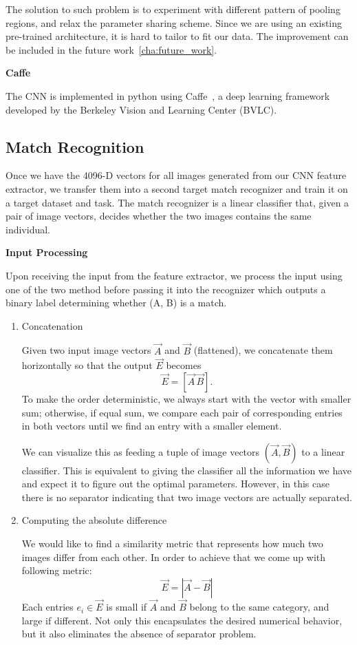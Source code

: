 The solution to such problem is to experiment with different pattern of pooling
regions, and relax the parameter sharing scheme. Since we are using an existing
pre-trained architecture, it is hard to tailor to fit our data. The improvement
can be included in the future work~\ref{cha:future_work}.

\textbf{Caffe}

The CNN is implemented in python using Caffe~\cite{caffe}, a deep learning
framework developed by the Berkeley Vision and Learning Center (BVLC).

\subsection{Match Recognition}

Once we have the 4096-D vectors for all images generated from our CNN feature
extractor, we transfer them into a second target match recognizer and train it
on a target dataset and task. The match recognizer is a linear classifier that,
given a pair of image vectors, decides whether the two images contains the same
individual.

\textbf{Input Processing}

Upon receiving the input from the feature extractor, we process the input using
one of the two method before passing it into the recognizer which outputs a
binary label determining whether (A, B) is a match.

\begin{enumerate}
\item Concatenation

Given two input image vectors $\vec{A}$ and $\vec{B}$ (flattened), we
concatenate them horizontally so that the output $\vec{E}$ becomes $$\vec{E} =
[ \vec{A}\, \vec{B} ].$$ To make the order deterministic, we always start with
the vector with smaller sum; otherwise, if equal sum, we compare each pair of
corresponding entries in both vectors until we find an entry with a smaller
element.

We can visualize this as feeding a tuple of image vectors $( \vec{A}, \vec{B}
)$ to a linear classifier. This is equivalent to giving the classifier all the
information we have and expect it to figure out the optimal parameters.
However, in this case there is no separator indicating that two image vectors
are actually separated.

\item Computing the absolute difference

We would like to find a similarity metric that represents how much two images
differ from each other. In order to achieve that we come up with following
metric:
$$\vec{E} = |\vec{A} - \vec{B}|$$
Each entries $e_i \in \vec{E}$ is
small if $\vec{A}$ and $\vec{B}$ belong to the same category, and large if
different.  Not only this encapsulates the desired numerical behavior, but it
also eliminates the absence of separator problem.
  
\end{enumerate}


